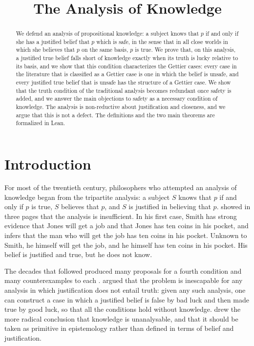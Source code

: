 \documentclass{situationist-preprint}
\title{The Analysis of Knowledge}
\begin{document}
\maketitle

\begin{abstract}
We defend an analysis of propositional knowledge: a subject knows that $p$ if and only if she has a justified belief that $p$ which is safe, in the sense that in all close worlds in which she believes that $p$ on the same basis, $p$ is true. We prove that, on this analysis, a justified true belief falls short of knowledge exactly when its truth is lucky relative to its basis, and we show that this condition characterizes the Gettier cases: every case in the literature that is classified as a Gettier case is one in which the belief is unsafe, and every justified true belief that is unsafe has the structure of a Gettier case. We show that the truth condition of the traditional analysis becomes redundant once safety is added, and we answer the main objections to safety as a necessary condition of knowledge. The analysis is non-reductive about justification and closeness, and we argue that this is not a defect. The definitions and the two main theorems are formalized in Lean.
\end{abstract}

\section{Introduction}

For most of the twentieth century, philosophers who attempted an analysis of knowledge began from the tripartite analysis: a subject $S$ knows that $p$ if and only if $p$ is true, $S$ believes that $p$, and $S$ is justified in believing that $p$. \citet{Gettier1963} showed in three pages that the analysis is insufficient. In his first case, Smith has strong evidence that Jones will get a job and that Jones has ten coins in his pocket, and infers that the man who will get the job has ten coins in his pocket. Unknown to Smith, he himself will get the job, and he himself has ten coins in his pocket. His belief is justified and true, but he does not know.

The decades that followed produced many proposals for a fourth condition and many counterexamples to each \citep{Shope1983}. \citet{Zagzebski1994} argued that the problem is inescapable for any analysis in which justification does not entail truth: given any such analysis, one can construct a case in which a justified belief is false by bad luck and then made true by good luck, so that all the conditions hold without knowledge. \citet{Williamson2000} drew the more radical conclusion that knowledge is unanalysable, and that it should be taken as primitive in epistemology rather than defined in terms of belief and justification.
\end{document}
